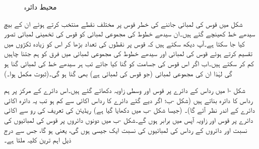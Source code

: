 \begin{figure}
\centering
\begin{minipage}{0.45\textwidth}
\centering
{}
\caption{قوس کی لمبائی}
\label{شکل_ابتدا_قوس_لمبائی}
\end{minipage}\hfill
\begin{minipage}{0.45\textwidth}
\centering
\centering
{}
\caption{محیط دائرہ}
\label{شکل_ابتدا_دائرہ_اور_ریڈیئن}
\end{minipage}%
\end{figure}

شکل  میں قوس کی لمبائی جاننے کی خطر قوس پر مختلف نقطے منتخب کرتے ہوئے ان کے بیچ سیدھے خط کھینچے گئے ہیں۔ان سیدھے خطوط کی مجموعی لمبائی کو قوس کی تخمینی لمبائی تصور کیا جا سکتا ہے۔آپ دیکھ سکتے ہیں کہ قوس پر نقطوں کی تعداد بڑھا کر اس کو زیادہ ٹکڑوں میں تقسیم کرتے ہوئے قوس کی لمبائی اور سیدھے خطوط کی مجموعی لمبائی میں فرق کو ہم جتنا چاہیں کم کر سکتے ہیں۔اب اگر اس قوس کی جسامت کو  گنا کیا جائے تب ہر سیدھے خط کی لمبائی  گنا ہو گی لہٰذا ان کی مجموعی لمبائی (جو قوس کی لمبائی ہے) بھی  گنا ہو گی۔(ثبوت مکمل ہوا۔)


شکل -ا میں رداس  کے دائرے پر قوس  اور وسطی زاویہ  دکھائے گئے ہیں۔اس دائرے کے مرکز پر ہم  رداس کا دائرہ بناتے ہیں (شکل -ب؛ اگر دیے گئے دائرے کا رداس اکائی سے کم ہو تب یہ دائرہ اکائی دائرے کے اندر نظر آئے گا)۔ (جیسا شکل -ب میں دکھایا گیا ہے) ریڈیئن کی تعریف کی رو سے اکائی دائرے پر قوس اور زاویہ آپس میں برابر ہوں گے۔شکل -ب میں دونوں دائروں پر  قوس کی لمبائیوں کی نسبت   اور دائروں کے رداس کی لمبائیوں کی نسبت   ایک  جیسی    ہوں گی، یعنی   ہو گا، جس سے درج ذیل اہم ترین کلیہ ملتا ہے۔

